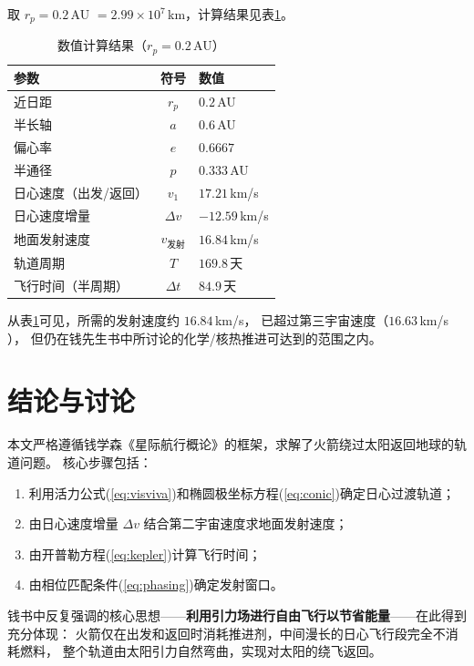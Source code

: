 \documentclass[12pt,a4paper]{ctexart}
\begin{document}
取 $r_p = 0.2$\,AU $= 2.99 \times 10^7$\,km，计算结果见表\ref{tab:results}。

\begin{table}[htbp]
\centering
\caption{数值计算结果（$r_p = 0.2$\,AU）}
\label{tab:results}
\begin{tabular}{lcl}
    \toprule
    参数 & 符号 & 数值 \\
    \midrule
    近日距             & $r_p$   & $0.2$\,AU \\
    半长轴             & $a$     & $0.6$\,AU \\
    偏心率             & $e$     & $0.6667$ \\
    半通径             & $p$     & $0.333$\,AU \\
    日心速度（出发/返回） & $v_1$ & $17.21$\,km/s \\
    日心速度增量       & $\Delta v$ & $-12.59$\,km/s \\
    地面发射速度       & $v_{\text{发射}}$ & $16.84$\,km/s \\
    轨道周期           & $T$     & $169.8$\,天 \\
    飞行时间（半周期） & $\Delta t$ & $84.9$\,天 \\
    \bottomrule
\end{tabular}
\end{table}

从表\ref{tab:results}可见，所需的发射速度约 $16.84$\,km/s，
已超过第三宇宙速度（$16.63$\,km/s \cite[\S1.5, pp.~18]{qian2008}），
但仍在钱先生书中所讨论的化学/核热推进可达到的范围之内\cite[第7章]{qian2008}。

\section{结论与讨论}

本文严格遵循钱学森《星际航行概论》的框架，求解了火箭绕过太阳返回地球的轨道问题。
核心步骤包括：
\begin{enumerate}[label=(\arabic*)]
    \item 利用活力公式(\ref{eq:visviva})和椭圆极坐标方程(\ref{eq:conic})确定日心过渡轨道；
    \item 由日心速度增量 $\Delta v$ 结合第二宇宙速度求地面发射速度；
    \item 由开普勒方程(\ref{eq:kepler})计算飞行时间；
    \item 由相位匹配条件(\ref{eq:phasing})确定发射窗口。
\end{enumerate}

钱书中反复强调的核心思想——\textbf{利用引力场进行自由飞行以节省能量}——在此得到充分体现：
火箭仅在出发和返回时消耗推进剂，中间漫长的日心飞行段完全不消耗燃料，
整个轨道由太阳引力自然弯曲，实现对太阳的绕飞返回。

\printbibliography[title={参考文献}]
\end{document}
